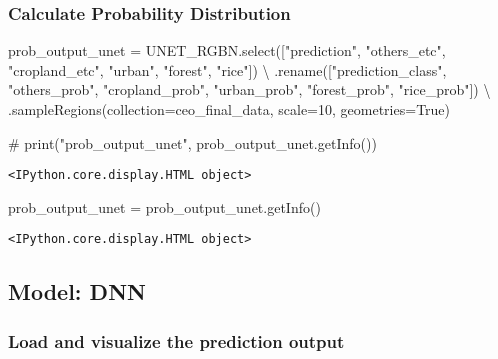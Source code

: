 \documentclass[
  letterpaper,
  DIV=11,
  numbers=noendperiod]{scrreprt}
\newenvironment{Shaded}{\begin{snugshade}}{\end{snugshade}}
\newcommand{\CommentTok}[1]{\textcolor[rgb]{0.37,0.37,0.37}{#1}}
\newcommand{\DecValTok}[1]{\textcolor[rgb]{0.68,0.00,0.00}{#1}}
\newcommand{\NormalTok}[1]{\textcolor[rgb]{0.00,0.23,0.31}{#1}}
\newcommand{\OperatorTok}[1]{\textcolor[rgb]{0.37,0.37,0.37}{#1}}
\newcommand{\StringTok}[1]{\textcolor[rgb]{0.13,0.47,0.30}{#1}}
\newcommand{\VariableTok}[1]{\textcolor[rgb]{0.07,0.07,0.07}{#1}}
\begin{document}
\subsubsection{Calculate Probability
Distribution}\label{calculate-probability-distribution}

\begin{Shaded}
\begin{Highlighting}[]
\NormalTok{prob\_output\_unet }\OperatorTok{=}\NormalTok{ UNET\_RGBN.select([}\StringTok{"prediction"}\NormalTok{, }\StringTok{"others\_etc"}\NormalTok{, }\StringTok{"cropland\_etc"}\NormalTok{, }\StringTok{"urban"}\NormalTok{, }\StringTok{"forest"}\NormalTok{, }\StringTok{"rice"}\NormalTok{]) }\OperatorTok{\textbackslash{}}
\NormalTok{                            .rename([}\StringTok{"prediction\_class"}\NormalTok{, }\StringTok{"others\_prob"}\NormalTok{, }\StringTok{"cropland\_prob"}\NormalTok{, }\StringTok{"urban\_prob"}\NormalTok{, }\StringTok{"forest\_prob"}\NormalTok{, }\StringTok{"rice\_prob"}\NormalTok{]) }\OperatorTok{\textbackslash{}}
\NormalTok{                            .sampleRegions(collection}\OperatorTok{=}\NormalTok{ceo\_final\_data, scale}\OperatorTok{=}\DecValTok{10}\NormalTok{, geometries}\OperatorTok{=}\VariableTok{True}\NormalTok{)}

\CommentTok{\# print("prob\_output\_unet", prob\_output\_unet.getInfo())}
\end{Highlighting}
\end{Shaded}

\begin{verbatim}
<IPython.core.display.HTML object>
\end{verbatim}

\begin{Shaded}
\begin{Highlighting}[]
\NormalTok{prob\_output\_unet }\OperatorTok{=}\NormalTok{ prob\_output\_unet.getInfo()}
\end{Highlighting}
\end{Shaded}

\begin{verbatim}
<IPython.core.display.HTML object>
\end{verbatim}

\subsection{Model: DNN}\label{model-dnn}

\subsubsection{Load and visualize the prediction
output}\label{load-and-visualize-the-prediction-output-1}
\end{document}
